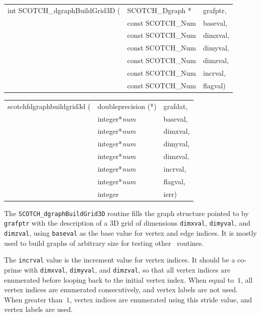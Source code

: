 \begin{itemize}
\progsyn

{\tt\begin{tabular}{l@{}ll}
int SCOTCH\_dgraphBuildGrid3D ( & SCOTCH\_Dgraph *  & grafptr, \\
                                & const SCOTCH\_Num & baseval, \\
                                & const SCOTCH\_Num & dimxval, \\
                                & const SCOTCH\_Num & dimyval, \\
                                & const SCOTCH\_Num & dimzval, \\
                                & const SCOTCH\_Num & incrval, \\
                                & const SCOTCH\_Num & flagval)
\end{tabular}}

{\tt\begin{tabular}{l@{}ll}
scotchfdgraphbuildgrid3d ( & doubleprecision (*) & grafdat, \\
                           & integer*{\it num}   & baseval, \\
                           & integer*{\it num}   & dimxval, \\
                           & integer*{\it num}   & dimyval, \\
                           & integer*{\it num}   & dimzval, \\
                           & integer*{\it num}   & incrval, \\
                           & integer*{\it num}   & flagval, \\
                           & integer             & ierr)
\end{tabular}}

\progdes

The \texttt{SCOTCH\_dgraphBuildGrid3D} routine fills the graph
structure pointed to by \texttt{grafptr} with the description of a 3D
grid of dimensions \texttt{dimxval}, \texttt{dimyval}, and
\texttt{dimzval}, using \texttt{baseval} as the base value for vertex
and edge indices. It is mostly used to build graphs of arbitrary size
for testing other \ptscotch\ routines.

The \texttt{incrval} value is the increment value for vertex
indices. It should be a co-prime with \texttt{dimxval},
\texttt{dimyval}, and \texttt{dimzval}, so that all vertex indices are
enumerated before looping back to the initial vertex index. When equal
to~$1$, all vertex indices are enumerated consecutively, and vertex
labels are not used. When greater than~$1$, vertex indices are
enumerated using this stride value, and vertex labels are used.


\end{itemize}

